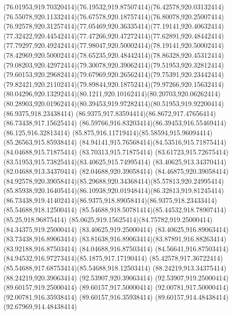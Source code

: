 {{	\curveto(76.01953,919.70320414)(76.19532,919.87507414)(76.42578,920.03132414)
	\curveto(76.55078,920.11332414)(76.67578,920.18757414)(76.80078,920.25007414)
	\curveto(76.92578,920.31257414)(77.05469,920.36335414)(77.19141,920.40632414)
	\curveto(77.32422,920.44542414)(77.47266,920.47272414)(77.62891,920.48442414)
	\curveto(77.79297,920.49242414)(77.98047,920.50002414)(78.19141,920.50002414)
	\curveto(78.42969,920.50002414)(78.65235,920.48442414)(78.86328,920.45312414)
	\curveto(79.08203,920.42972414)(79.30078,920.39062414)(79.51953,920.32812414)
	\curveto(79.60153,920.29682414)(79.67969,920.26562414)(79.75391,920.23442414)
	\curveto(79.82421,920.21102414)(79.89844,920.18752414)(79.97266,920.15632414)
	\curveto(80.04296,920.13292414)(80.1211,920.10162414)(80.20703,920.06262414)
	\curveto(80.28903,920.01962414)(80.39453,919.97282414)(80.51953,919.92200414)
	\closepath
	\moveto(86.9375,918.23438414)
	\curveto(86.9375,917.83594414)(86.8672,917.47656414)(86.73438,917.15625414)
	\curveto(86.59766,916.83203414)(86.39453,916.55469414)(86.125,916.32813414)
	\curveto(85.875,916.11719414)(85.58594,915.96094414)(85.26563,915.85938414)
	\curveto(84.94141,915.76568414)(84.53516,915.71875414)(84.04688,915.71875414)
	\lineto(83.70313,915.71875414)
	\curveto(83.61723,915.72675414)(83.51953,915.73825414)(83.40625,915.74995414)
	\lineto(83.40625,913.34370414)
	\lineto(82.04688,913.34370414)
	\lineto(82.04688,920.39058414)
	\lineto(84.46875,920.39058414)
	\curveto(84.92578,920.39058414)(85.29688,920.34368414)(85.57813,920.24995414)
	\curveto(85.85938,920.16405414)(86.10938,920.01948414)(86.32813,919.81245414)
	\curveto(86.73438,919.41402414)(86.9375,918.89058414)(86.9375,918.23433414)
	\closepath
	\moveto(85.54688,918.12500414)
	\curveto(85.54688,918.50781414)(85.44532,918.78907414)(85.25,918.96875414)
	\curveto(85.0625,919.15625414)(84.75782,919.25000414)(84.34375,919.25000414)
	\lineto(83.40625,919.25000414)
	\lineto(83.40625,916.89063414)
	\lineto(83.73438,916.89063414)
	\curveto(83.81638,916.89063414)(83.87891,916.88263414)(83.92188,916.87503414)
	\lineto(84.04688,916.87503414)
	\curveto(84.56641,916.87503414)(84.94532,916.97273414)(85.1875,917.17190414)
	\curveto(85.42578,917.36722414)(85.54688,917.68753414)(85.54688,918.12503414)
	\closepath
	\moveto(88.24219,913.34375414)
	\lineto(88.24219,920.39063414)
	\lineto(92.53907,920.39063414)
	\lineto(92.53907,919.25000414)
	\lineto(89.60157,919.25000414)
	\lineto(89.60157,917.50000414)
	\lineto(92.00781,917.50000414)
	\lineto(92.00781,916.35938414)
	\lineto(89.60157,916.35938414)
	\lineto(89.60157,914.48438414)
	\lineto(92.67969,914.48438414)
}}

